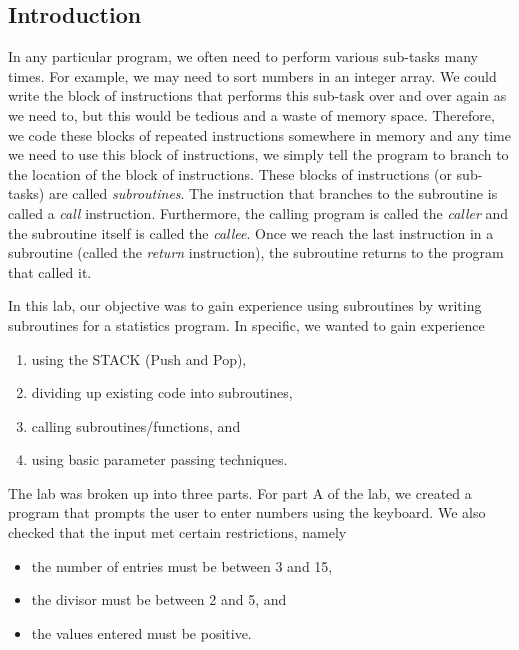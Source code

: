\documentclass[10pt, letterpaper, titlepage]{article} %
\title{\textbf{\Huge{
\begin{center}
Introduction to\\ Subroutines \\
\end{center}
}}}
\author{\B enjamin Kong | 1573684\\Lora Ma ||||| 1570935\\ \\ECE 212 Lab Section H11}
\begin{document}
 
\maketitle 
\thispagestyle{empty}
\tableofcontents 
\newpage
{}

\begin{multicols*}{2}


\section{Introduction}
In any particular program, we often need to perform various sub-tasks many times. 
For example, we may need to sort numbers in an integer array. 
We could write the block of instructions that performs this sub-task over and over again as we need to, but this would be tedious and a waste of memory space. 
Therefore, we code these blocks of repeated instructions somewhere in memory and any time we need to use this block of instructions, we simply tell the program to branch to the location of the block of instructions. 
These blocks of instructions (or sub-tasks) are called \textit{subroutines}. 
The instruction that branches to the subroutine is called a \textit{call} instruction. 
Furthermore, the calling program is called the \textit{caller} and the subroutine itself is called the \textit{callee}. 
Once we reach the last instruction in a subroutine (called the \textit{return} instruction), the subroutine returns to the program that called it. 

In this lab, our objective was to gain experience using subroutines by writing subroutines for a statistics program. 
In specific, we wanted to gain experience
\begin{enumerate}
\item using the STACK (Push and Pop),
\item dividing up existing code into subroutines,
\item calling subroutines/functions, and
\item using basic parameter passing techniques.
\end{enumerate}
The lab was broken up into three parts. 
For part A of the lab, we created a program that prompts the user to enter numbers using the keyboard. 
We also checked that the input met certain restrictions, namely
\begin{itemize}
\item the number of entries must be between 3 and 15,
\item the divisor must be between 2 and 5, and
\item the values entered must be positive.
\end{itemize}


\end{multicols*}
\end{document}
